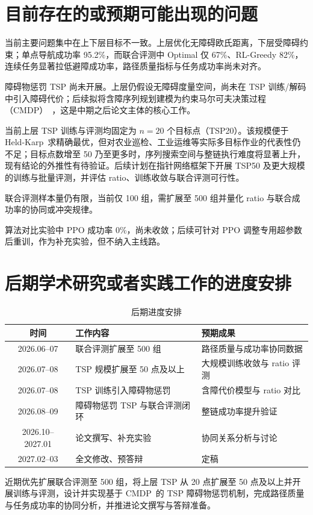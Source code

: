 \section{目前存在的或预期可能出现的问题}

当前主要问题集中在上下层目标不一致。上层优化无障碍欧氏距离，下层受障碍约束；单点导航成功率 95.2\%，而联合评测中 Optimal 仅 67\%、RL-Greedy 82\%，连续任务显著拉低避障成功率，路径质量指标与任务成功率尚未对齐。

障碍物惩罚 TSP 尚未开展。上层仍假设无障碍度量空间，尚未在 TSP 训练/解码中引入障碍代价；后续拟将含障序列规划建模为约束马尔可夫决策过程（CMDP）~\cite{altman2021cmdp}，这是中期之后论文主体的核心工作。

当前上层 TSP 训练与评测均固定为 $n=20$ 个目标点（TSP20）。该规模便于 Held-Karp~\cite{lin1973karp}求精确最优，但对农业巡检、工业运维等实际多目标作业的代表性仍不足；目标点数增至 50 乃至更多时，序列搜索空间与整链执行难度将显著上升，现有结论的外推性有待验证。后续计划在指针网络框架下开展 TSP50 及更大规模的训练与批量评测，并评估 ratio、训练收敛与联合评测可行性。

联合评测样本量仍有限，当前仅 100 组，需扩展至 500 组并量化 ratio 与联合成功率的协同或冲突规律。

算法对比实验中 PPO 成功率 0\%，尚未收敛；后续可针对 PPO 调整专用超参数后重训，作为补充实验，但不纳入主线路。

\section{后期学术研究或者实践工作的进度安排}

\begin{table}[htbp]
  \centering
  \caption{后期进度安排}
  \label{tab:schedule}
  \begin{tabular}{clp{5.2cm}}
    \toprule
    时间 & 工作内容 & 预期成果 \\
    \midrule
    2026.06--07 & 联合评测扩展至 500 组 & 路径质量与成功率协同数据 \\
    2026.07--08 & TSP 规模扩展至 50 点及以上 & 大规模训练收敛与 ratio 评测 \\
    2026.07--08 & TSP 训练引入障碍物惩罚 & 含障代价模型与 ratio 对比 \\
    2026.08--09 & 障碍物惩罚 TSP 与联合评测闭环 & 整链成功率提升验证 \\
    2026.10--2027.01 & 论文撰写、补充实验 & 协同关系分析与讨论 \\
    2027.02--03 & 全文修改、预答辩 & 定稿 \\
    \bottomrule
  \end{tabular}
\end{table}

近期优先扩展联合评测至 500 组，将上层 TSP 从 20 点扩展至 50 点及以上并开展训练与评测，设计并实现基于 CMDP~\cite{altman2021cmdp}的 TSP 障碍物惩罚机制，完成路径质量与任务成功率的协同分析，并推进论文撰写与答辩准备。



